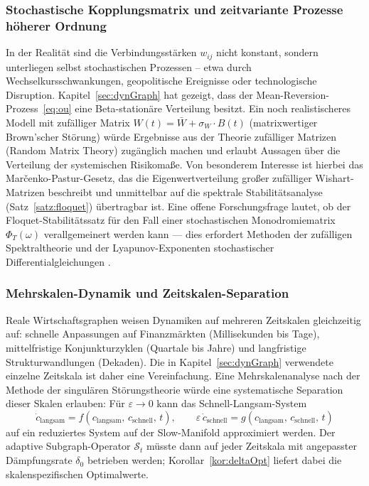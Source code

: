 ﻿\documentclass[a4paper,12pt]{article}
\theoremstyle{definition}
\begin{document}
\subsubsection{Stochastische Kopplungsmatrix und zeitvariante Prozesse höherer Ordnung}

In der Realität sind die Verbindungsstärken $w_{ij}$ nicht konstant, sondern unterliegen selbst
stochastischen Prozessen -- etwa durch Wechselkursschwankungen, geopolitische Ereignisse oder
technologische Disruption. Kapitel~\ref{sec:dynGraph} hat gezeigt, dass der
Mean-Reversion-Prozess~\eqref{eq:ou} eine Beta-stationäre Verteilung besitzt. Ein noch
realistischeres Modell mit zufälliger Matrix $W(t) = \bar{W} + \sigma_W \cdot B(t)$
(matrixwertiger Brown'scher Störung) würde Ergebnisse aus der Theorie zufälliger Matrizen
(Random Matrix Theory) \citep{mehta2004random} zugänglich machen und erlaubt Aussagen über
die Verteilung der systemischen Risikomaße. Von besonderem Interesse ist hierbei das
Mar\v{c}enko-Pastur-Gesetz, das die Eigenwertverteilung großer zufälliger Wishart-Matrizen
beschreibt und unmittelbar auf die spektrale Stabilitätsanalyse (Satz~\ref{satz:floquet})
übertragbar ist. Eine offene Forschungsfrage lautet, ob der Floquet-Stabilitätssatz
für den Fall einer stochastischen Monodromiematrix $\Phi_T(\omega)$ verallgemeinert werden
kann --- dies erfordert Methoden der zufälligen Spektraltheorie und der Lyapunov-Exponenten
stochastischer Differentialgleichungen \citep{arnold1998random}.

\subsubsection{Mehrskalen-Dynamik und Zeitskalen-Separation}

Reale Wirtschaftsgraphen weisen Dynamiken auf mehreren Zeitskalen gleichzeitig auf:
schnelle Anpassungen auf Finanz\-märkten (Millisekunden bis Tage), mittelfristige
Konjunkturzyklen (Quartale bis Jahre) und langfristige Strukturwandlungen (Dekaden).
Die in Kapitel~\ref{sec:dynGraph} verwendete einzelne Zeitskala ist daher eine
Vereinfachung. Eine Mehr\-skalen\-analyse nach der Methode der singulären
Störungstheorie \citep{kokotovic1999singular} würde eine systematische Separation
dieser Skalen erlauben: Für $\varepsilon \to 0$ kann das Schnell-Langsam-System
\[
    \dot{c}_{\text{langsam}} = f(c_{\text{langsam}},\, c_{\text{schnell}},\, t),
    \qquad
    \varepsilon\,\dot{c}_{\text{schnell}} = g(c_{\text{langsam}},\, c_{\text{schnell}},\, t)
\]
auf ein reduziertes System auf der Slow-Manifold approximiert werden. Der adaptive
Subgraph-Operator $\mathcal{S}_t$ müsste dann auf jeder Zeitskala mit angepasster
Dämpfungsrate $\delta_0$ betrieben werden; Korollar~\ref{kor:deltaOpt} liefert
dabei die skalenspezifischen Optimalwerte.
\end{document}
